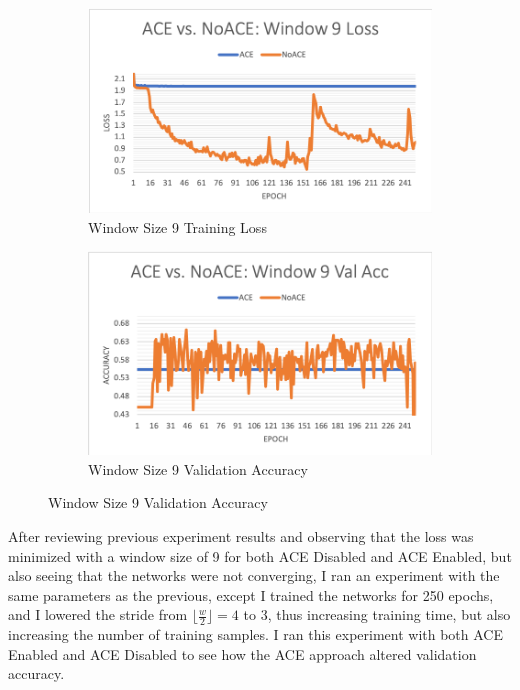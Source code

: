 \documentclass[12pt]{article}
\begin{document}
\begin{figure}[t]
	\begin{subfigure}{0.45\linewidth}
		\includegraphics[width=\linewidth]{acevnoace-window9-loss.png}
		\caption{Window Size 9 Training Loss}
	\end{subfigure}
	\hfill
	\begin{subfigure}{0.45\linewidth}
		\includegraphics[width=\linewidth]{acevnoace-window9-valacc.png}
		\caption{Window Size 9 Validation Accuracy}		
	\end{subfigure}
	

\end{figure}


After reviewing previous experiment results and observing that the loss was minimized with a window size of 9 for both ACE Disabled and ACE Enabled, but also seeing that the networks were not converging, I ran an experiment with the same parameters as the previous, except I trained the networks for 250 epochs, and I lowered the stride from $\lfloor\frac{w}{2}\rfloor = 4$ to 3, thus increasing training time, but also increasing the number of training samples. 
%
I ran this experiment with both ACE Enabled and ACE Disabled to see how the ACE approach altered validation accuracy. 
\end{document}
